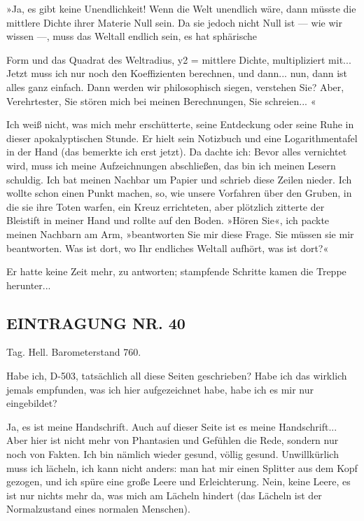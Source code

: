 »Ja, es gibt keine Unendlichkeit! Wenn die Welt unendlich wäre,
dann müsste die mittlere Dichte ihrer Materie Null sein. Da sie
jedoch nicht Null ist — wie wir wissen —, muss das Weltall endlich
sein, es hat sphärische

Form und das Quadrat des Weltradius, y2 = mittlere Dichte,
multipliziert mit... Jetzt muss ich nur noch den Koeffizienten
berechnen, und dann... nun, dann ist alles ganz einfach. Dann
werden wir philosophisch siegen, verstehen Sie? Aber, Verehrtester,
Sie stören mich bei meinen Berechnungen, Sie schreien... «

Ich weiß nicht, was mich mehr erschütterte, seine Entdeckung oder
seine Ruhe in dieser apokalyptischen Stunde. Er hielt sein
Notizbuch und eine Logarithmentafel in der Hand (das bemerkte ich
erst jetzt). Da dachte ich: Bevor alles vernichtet wird, muss ich
meine Aufzeichnungen abschließen, das bin ich meinen Lesern
schuldig. Ich bat meinen Nachbar um Papier und schrieb diese Zeilen
nieder. Ich wollte schon einen Punkt machen, so, wie unsere
Vorfahren über den Gruben, in die sie ihre Toten warfen, ein Kreuz
errichteten, aber plötzlich zitterte der Bleistift in meiner Hand
und rollte auf den Boden. »Hören Sie«, ich packte meinen Nachbarn
am Arm, »beantworten Sie mir diese Frage. Sie müssen sie mir
beantworten. Was ist dort, wo Ihr endliches Weltall aufhört, was
ist dort?«

Er hatte keine Zeit mehr, zu antworten; stampfende Schritte kamen
die Treppe herunter...

\subsection{EINTRAGUNG NR. 40}

Tag. Hell. Barometerstand 760.

Habe ich, D-503, tatsächlich all diese Seiten geschrieben? Habe ich
das wirklich jemals empfunden, was ich hier aufgezeichnet habe,
habe ich es mir nur eingebildet?

Ja, es ist meine Handschrift. Auch auf dieser Seite ist es meine
Handschrift... Aber hier ist nicht mehr von Phantasien und Gefühlen
die Rede, sondern nur noch von Fakten. Ich bin nämlich wieder
gesund, völlig gesund. Unwillkürlich muss ich lächeln, ich kann
nicht anders: man hat mir einen Splitter aus dem Kopf gezogen, und
ich spüre eine große Leere und Erleichterung. Nein, keine Leere, es
ist nur nichts mehr da, was mich am Lächeln hindert (das Lächeln
ist der Normalzustand eines normalen Menschen).

